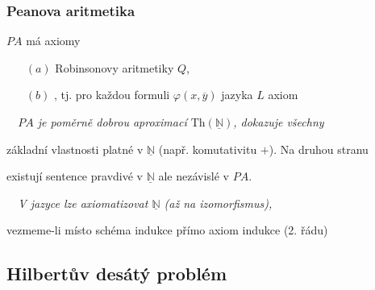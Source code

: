     
    
    
    
    
    \subsubsection*{Peanova aritmetika}
    
     $PA$ má axiomy
    
    \begin{enumerate}
    \item[$(a)$] Robinsonovy aritmetiky $Q$,
    \smallskip
    
    \item[$(b)$] , tj. pro každou formuli $\varphi(x,\overline{y})$ jazyka $L$ axiom
    
    
    
    \end{enumerate}
    
    {\it {}\ \ $PA$ je poměrně dobrou aproximací $\mathrm{Th}(\underline{\mathbb{N}})$, dokazuje všechny
    \smallskip
    
    základní vlastnosti platné v $\underline{\mathbb{N}}$ (např. komutativitu $+$). Na druhou stranu
    \smallskip
    
    existují sentence pravdivé v $\underline{\mathbb{N}}$ ale nezávislé v $PA$.}
    \bigskip
    
    {\it {}\ \ V jazyce  lze axiomatizovat $\underline{\mathbb{N}}$ (až na izomorfismus),
    \smallskip
    
    vezmeme-li místo schéma indukce přímo axiom indukce (2. řádu)}
    
    
    
    

\subsection{Hilbertův desátý problém}\todo

